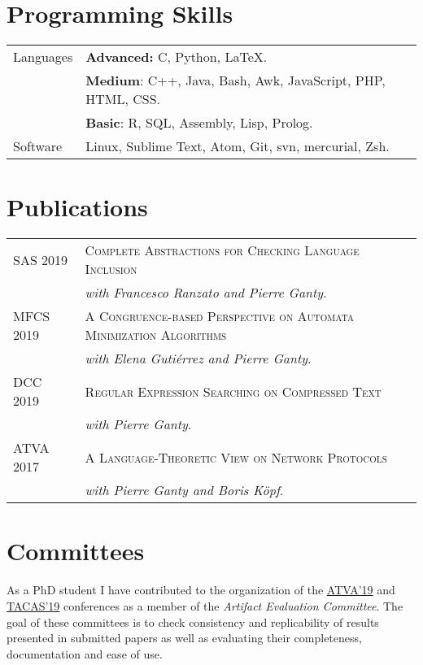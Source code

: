 \documentclass[a4paper,10pt]{article} %
\begin{document}
\section{Programming Skills}
\begin{tabular}{p{2.5cm}p{13.2cm}}
\small{Languages} & \textcolor{azureblue}{\textbf{Advanced:}} C, Python, \LaTeX.\\
[1pt]
& \textcolor{battleshipgrey}{\textbf{Medium}}: C++, Java, Bash, Awk, JavaScript, PHP, HTML, CSS.\\
& \textbf{Basic}: R, SQL, Assembly, Lisp, Prolog.\\
[3pt]
\small{Software} & Linux, Sublime Text, Atom, Git, svn, mercurial, Zsh.\\
\end{tabular}

\section{Publications}
\begin{tabular}{p{2.5cm}p{13.2cm}}
\small{SAS 2019} & \textsc{Complete Abstractions for Checking Language Inclusion} \\
& \textit{with Francesco Ranzato and Pierre Ganty}. \\
[3pt]
\small{MFCS 2019} & \textsc{A Congruence-based Perspective on Automata Minimization Algorithms} \\
 & \textit{with Elena Gutiérrez and Pierre Ganty}. \\
[3pt]
\small{DCC 2019} & \textsc{Regular Expression Searching on Compressed Text} \\
 & \textit{with Pierre Ganty}. \\
[3pt]
\small{ATVA 2017} & \textsc{A Language-Theoretic View on Network Protocols} \\
& \textit{with Pierre Ganty and Boris Köpf}. \\
\end{tabular}

\section{Committees}
As a PhD student I have contributed to the organization of the \href{http://atva2019.iis.sinica.edu.tw/organization/}{ATVA'19} and \href{https://conf.researchr.org/track/etaps-2019/tacas-2019-papers#Artifact-Evaluation}{TACAS'19} conferences as a member of the \emph{Artifact Evaluation Committee}. 
The goal of these committees is to check consistency and replicability of results presented in submitted papers as well as evaluating their completeness, documentation and ease of use.
\end{document}
